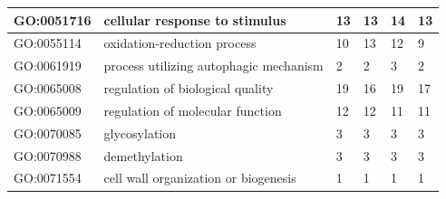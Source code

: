 \documentclass[12pt]{article}
\begin{document}
\begin{longtable}{ | p{2.2cm} | p{4cm} |p{2cm} | p{2cm} | p{2cm} | p{2cm} |}
 \hline
GO:0051716&cellular response to stimulus&13&13&14&13\\
 \hline
GO:0055114&oxidation-reduction process&10&13&12&9\\
 \hline
GO:0061919&process utilizing autophagic mechanism&2&2&3&2\\
 \hline
GO:0065008&regulation of biological quality&19&16&19&17\\
 \hline
GO:0065009&regulation of molecular function&12&12&11&11\\
 \hline
GO:0070085&glycosylation&3&3&3&3\\
 \hline
GO:0070988&demethylation&3&3&3&3\\

GO:0071554&cell wall organization or biogenesis&1&1&1&1\\


\end{longtable}
\end{document}
